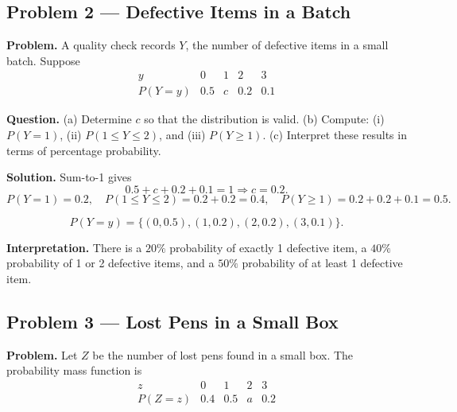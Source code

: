 \begin{ExamProblems}
		\item
		\subsection*{Problem 2 — Defective Items in a Batch}
		
		\textbf{Problem.}
		A quality check records $Y$, the number of defective items in a small batch. Suppose
		\[
		\begin{array}{c|cccc}
			y & 0 & 1 & 2 & 3\\
			\hline
			P(Y=y) & 0.5 & c & 0.2 & 0.1
		\end{array}
		\]
		
		\textbf{Question.}
		(a) Determine $c$ so that the distribution is valid.
		(b) Compute: (i) $P(Y=1)$, (ii) $P(1\le Y\le 2)$, and (iii) $P(Y\ge 1)$.
		(c) Interpret these results in terms of percentage probability.
		
		\textbf{Solution.}
		Sum-to-1 gives
		\[
		0.5+c+0.2+0.1=1\Rightarrow c=0.2.
		\]
		\[
		P(Y=1)=0.2,\quad
		P(1\le Y\le 2)=0.2+0.2=0.4,\quad
		P(Y\ge 1)=0.2+0.2+0.1=0.5.
		\]
		
\[
		P(Y=y)=\{(0,0.5),(1,0.2),(2,0.2),(3,0.1)\}.
		\]
\begin{center}
		\end{center}
\textbf{Interpretation.} There is a $20\%$ probability of exactly 1 defective item, a $40\%$ probability of 1 or 2 defective items, and a $50\%$ probability of at least 1 defective item.
		
		
		\item
		\subsection*{Problem 3 — Lost Pens in a Small Box}
		
		\textbf{Problem.}
		Let $Z$ be the number of lost pens found in a small box. The probability mass function is
		\[
		\begin{array}{c|cccc}
			z & 0 & 1 & 2 & 3\\
			\hline
			P(Z=z) & 0.4 & 0.5 & a & 0.2
		\end{array}
		\]
		

\end{ExamProblems}
